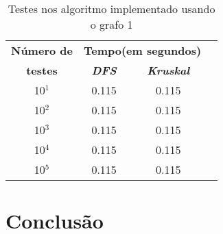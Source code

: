 \documentclass[12pt]{article}
\begin{document}
  \begin{table}[htbp]
    \caption{Testes nos algoritmo implementado usando o grafo 1}
    \begin{center}
    \begin{tabular}{|c|c|c|c|}
    \hline
    \textbf{Número de}&\multicolumn{2}{|c|}{\textbf{Tempo(em segundos)}} \\
    \cline{2-3} 
    \textbf{testes} & \textbf{\textit{DFS}}& \textbf{\textit{Kruskal}} \\
    \hline
    10$^{\mathrm{1}}$& 0.115 & 0.115 \\
    \hline
    10$^{\mathrm{2}}$& 0.115 & 0.115 \\
    \hline
    10$^{\mathrm{3}}$& 0.115 & 0.115 \\
    \hline
    10$^{\mathrm{4}}$& 0.115 & 0.115 \\
    \hline
    10$^{\mathrm{5}}$& 0.115 & 0.115 \\
    \hline
    \end{tabular}
    \end{center}
  \end{table}

  \newpage
  
  \section{Conclusão} \label{sec:conclusion}
\end{document}
